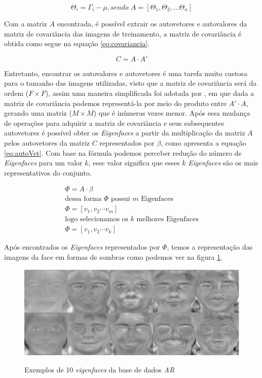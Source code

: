 \begin{equation}
\Theta_i = \Gamma _i - \mu, \textit{sendo A} = [\Theta_1,\Theta_2,...\Theta_n]
\label{eq:teta}
\end{equation}

Com a matriz $A$ encontrada, é possível extrair os autovetores e autovalores da matriz de covariância das imagens de treinamento, a matriz de covariância é obtida como segue na equação \ref{eq:covariancia}.

\begin{equation}
C = A \cdot A'
\label{eq:covariancia}
\end{equation}

Entretanto, encontrar os autovalores e autovetores é uma tarefa muito custosa para o tamanho das imagens utilizadas, visto que a matriz de covariância será da ordem ($F \times F$), assim uma maneira simplificada foi adotada por , em que dada a matriz de covariância podemos representá-la por meio do produto entre $A'\cdot A$, gerando uma matriz ($M \times M$) que é inúmeras vezes menor. Após essa mudança de operações para adquirir a matriz de covariância e seus subsequentes autovetores é possível obter os \textit{Eigenfaces} a partir da multiplicação da matriz $A$ pelos autovetores da matriz $C$ representados por $\beta$, como apresenta a equação \ref{eq:autoVet}. Com base na fórmula podemos perceber redução do número de \textit{Eigenfaces} para um valor $k$, esse valor significa que esses $k$ \textit{Eigenfaces} são os mais representativos do conjunto.

\begin{equation}
\begin{matrix}
\Phi = A \cdot \beta  \\
\textrm{dessa forma } \Phi \textrm{ possui } m \textrm{ Eigenfaces} \\
\Phi  = [v_{1},v_{2} \cdots v_m] \\
\textrm{logo selecionamos os } k \textrm{ melhores Eigenfaces}\\
\Phi = [v_{1},v_{2} \cdots v_k] 
\end{matrix}
\label{eq:autoVet}
\end{equation}

Após encontrados os \textit{Eigenfaces} representados por $\Phi$, temos a representação das imagens da face em formas de sombras como podemos ver na figura \ref{fig:eigenfaces}. 

\begin{figure}[H]
\centering
\caption{Exemplos de 10 \textit{eigenfaces} da base de dados \textit{AR}}
\includegraphics[scale = 0.90]{imgs/eigenfaces.png}
\label{fig:eigenfaces}
\end{figure}


